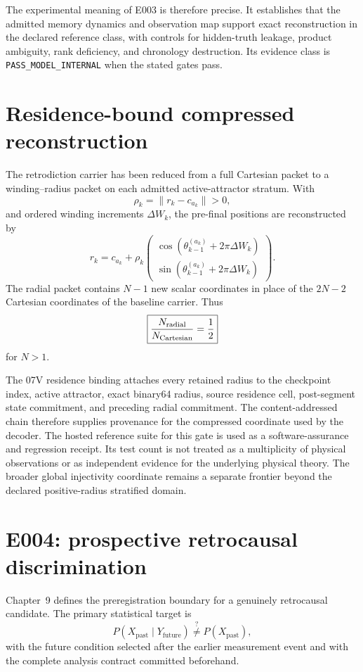The experimental meaning of E003 is therefore precise. It establishes that the admitted memory dynamics and observation map support exact reconstruction in the declared reference class, with controls for hidden-truth leakage, product ambiguity, rank deficiency, and chronology destruction. Its evidence class is \texttt{PASS\_MODEL\_INTERNAL} when the stated gates pass.

\section{Residence-bound compressed reconstruction}

The retrodiction carrier has been reduced from a full Cartesian packet to a winding--radius packet on each admitted active-attractor stratum. With
\[
\rho_k=\|r_k-c_{a_k}\|>0,
\]
and ordered winding increments \(\Delta W_k\), the pre-final positions are reconstructed by
\[
r_k=c_{a_k}+\rho_k
\begin{pmatrix}
\cos(\theta_{k-1}^{(a_k)}+2\pi\Delta W_k)\\
\sin(\theta_{k-1}^{(a_k)}+2\pi\Delta W_k)
\end{pmatrix}.
\]
The radial packet contains \(N-1\) new scalar coordinates in place of the \(2N-2\) Cartesian coordinates of the baseline carrier. Thus
\[
\boxed{
\frac{N_{\rm radial}}{N_{\rm Cartesian}}=\frac12
}
\]
for \(N>1\).

The 07V residence binding attaches every retained radius to the checkpoint index, active attractor, exact binary64 radius, source residence cell, post-segment state commitment, and preceding radial commitment. The content-addressed chain therefore supplies provenance for the compressed coordinate used by the decoder. The hosted reference suite for this gate is used as a software-assurance and regression receipt. Its test count is not treated as a multiplicity of physical observations or as independent evidence for the underlying physical theory. The broader global injectivity coordinate remains a separate frontier beyond the declared positive-radius stratified domain.

\section{E004: prospective retrocausal discrimination}

Chapter~9 defines the preregistration boundary for a genuinely retrocausal candidate. The primary statistical target is
\[
P(X_{\mathrm{past}}\mid Y_{\mathrm{future}})
\stackrel{?}{\neq}
P(X_{\mathrm{past}}),
\]
with the future condition selected after the earlier measurement event and with the complete analysis contract committed beforehand.

